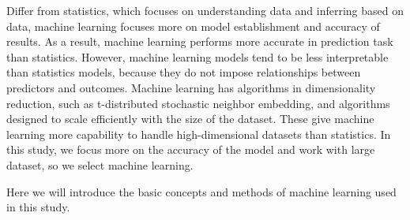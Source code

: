 \documentclass[12pt,a4paper,english
]{tunithesis}
\begin{document}
Differ from statistics, which focuses on understanding data and inferring based on data, machine learning focuses more on model establishment and accuracy of results. As a result, machine learning performs more accurate in prediction task than statistics. However, machine learning models tend to be less interpretable than statistics models, because they do not impose relationships between predictors and outcomes. Machine learning has algorithms in dimensionality reduction, such as t-distributed stochastic neighbor embedding, and algorithms designed to scale efficiently with the size of the dataset. These give machine learning more capability to handle high-dimensional datasets than statistics. \parencite{Bzdok2018, Rajula2020, turin2020} In this study, we focus more on the accuracy of the model and work with large dataset, so we select machine learning.

Here we will introduce the basic concepts and methods of machine learning used in this study.
\end{document}
